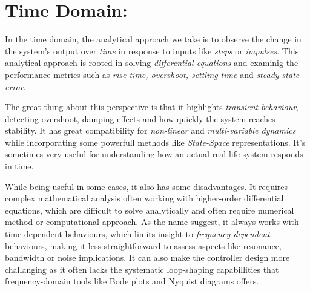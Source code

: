 \documentclass{report}
\begin{document}
\section{Time Domain:}
\par
In the time domain, the analytical approach we take is to observe the change in the system's output over \textit{time} in response to inputs like \textit{steps} or \textit{impulses}. This analytical approach is rooted
            in solving \textit{differential equations} and examinig the performance metrics such as \textit{rise time, overshoot, settling time} and \textit{steady-state error}.
\\
\par
The great thing about this perspective is that it highlights \textit{transient behaviour}, detecting overshoot, damping effects and how quickly the system reaches stability. It has great compatibility
for \textit{non-linear} and \textit{multi-variable dynamics} while incorporating some powerfull methods like \textit{State-Space} representations. It's sometimes very useful for understanding how an actual real-life
system responds in time.
\\
\par
While being useful in some cases, it also has some disadvantages. It requires complex mathematical analysis often working with higher-order differential equations,
which are difficult to solve analytically and often require numerical method or computational approach. As the name suggest, it always works with time-dependent behaviours,
which limits insight to \textit{frequency-dependent} behaviours, making it less straightforward to assess aspects like resonance, bandwidth or noise implications. It can also make
the controller design more challanging as it often lacks the systematic loop-shaping capabillities that frequency-domain tools like Bode plots and
Nyquist diagrams offers.
\end{document}
